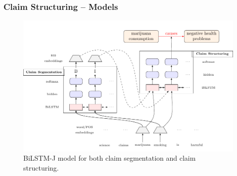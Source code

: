 \documentclass{beamer}
\begin{document}
\begin{frame}
	\frametitle{Claim Structuring -- Models}
\begin{figure}
	\includegraphics[scale=0.63]{../joint_tikz-figure0.pdf}
	\caption{BiLSTM-J model for both claim segmentation and claim 
	structuring. }
\end{figure}
\end{frame}
\end{document}
